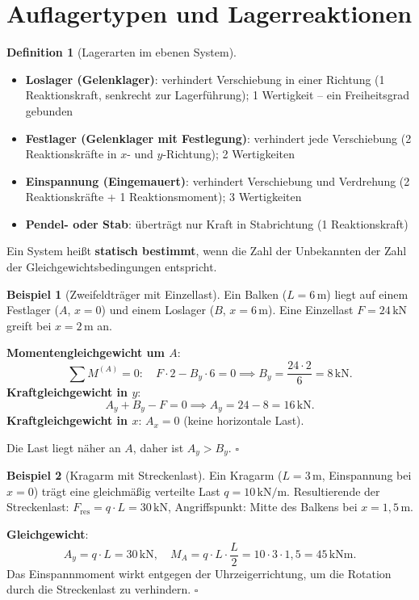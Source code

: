 ﻿\documentclass[a4paper,12pt]{report}
\theoremstyle{definition}
\newtheorem{definition}{Definition}
\newtheorem{beispiel}{Beispiel}
\begin{document}
\section{Auflagertypen und Lagerreaktionen}

\begin{definition}[Lagerarten im ebenen System]
\begin{itemize}
    \item[-] \textbf{Loslager (Gelenklager)}: verhindert Verschiebung in einer Richtung
          (1 Reaktionskraft, senkrecht zur Lagerf\"uhrung);
          1 Wertigkeit -- ein Freiheitsgrad gebunden
    \item[-] \textbf{Festlager (Gelenklager mit Festlegung)}: verhindert jede Verschiebung
          (2 Reaktionskr\"afte in $x$- und $y$-Richtung);
          2 Wertigkeiten
    \item[-] \textbf{Einspannung (Eingemauert)}: verhindert Verschiebung und Verdrehung
          (2 Reaktionskr\"afte + 1 Reaktionsmoment);
          3 Wertigkeiten
    \item[-] \textbf{Pendel- oder Stab}: \"ubertr\"agt nur Kraft in Stabrichtung (1 Reaktionskraft)
\end{itemize}
Ein System hei\ss{}t \textbf{statisch bestimmt}, wenn die Zahl der Unbekannten
der Zahl der Gleichgewichtsbedingungen entspricht.
\end{definition}

\begin{beispiel}[Zweifeldtr\"ager mit Einzellast]
Ein Balken ($L = 6\,\mathrm{m}$) liegt auf einem Festlager ($A$, $x = 0$)
und einem Loslager ($B$, $x = 6\,\mathrm{m}$). Eine Einzellast $F = 24\,\mathrm{kN}$
greift bei $x = 2\,\mathrm{m}$ an.

\medskip\noindent\textbf{Momentengleichgewicht um $A$}:
\[
  \sum M^{(A)} = 0: \quad F\cdot 2 - B_y\cdot 6 = 0
  \implies B_y = \frac{24\cdot 2}{6} = 8\,\mathrm{kN}.
\]
\textbf{Kraftgleichgewicht in $y$}:
\[
  A_y + B_y - F = 0 \implies A_y = 24 - 8 = 16\,\mathrm{kN}.
\]
\textbf{Kraftgleichgewicht in $x$}: $A_x = 0$ (keine horizontale Last).

Die Last liegt n\"aher an $A$, daher ist $A_y > B_y$. $\square$
\end{beispiel}

\begin{beispiel}[Kragarm mit Streckenlast]
Ein Kragarm ($L = 3\,\mathrm{m}$, Einspannung bei $x = 0$) tr\"agt eine
gleichm\"a\ss{}ig verteilte Last $q = 10\,\mathrm{kN/m}$.
Resultierende der Streckenlast: $F_{\text{res}} = q\cdot L = 30\,\mathrm{kN}$,
Angriffspunkt: Mitte des Balkens bei $x = 1{,}5\,\mathrm{m}$.

\medskip\noindent\textbf{Gleichgewicht}:
\[
  A_y = q\cdot L = 30\,\mathrm{kN}, \quad
  M_A = q\cdot L \cdot \frac{L}{2} = 10\cdot 3\cdot 1{,}5 = 45\,\mathrm{kNm}.
\]
Das Einspannmoment wirkt entgegen der Uhrzeigerrichtung,
um die Rotation durch die Streckenlast zu verhindern. $\square$
\end{beispiel}
\end{document}

